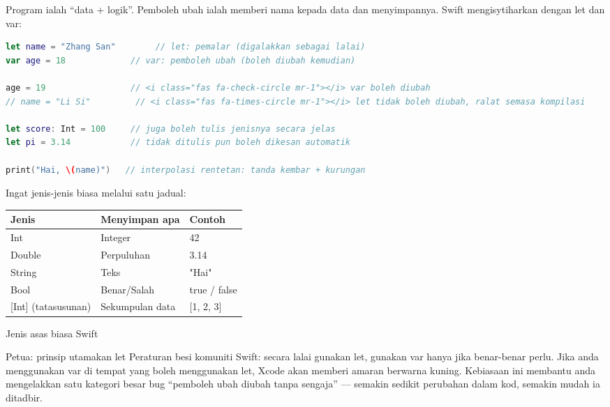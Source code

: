 


Program ialah “data + logik”. Pemboleh ubah ialah memberi nama kepada data dan menyimpannya. Swift mengisytiharkan dengan let dan var:

\begin{lstlisting}[language=Swift]
let name = "Zhang San"        // let: pemalar (digalakkan sebagai lalai)
var age = 18             // var: pemboleh ubah (boleh diubah kemudian)

age = 19                 // <i class="fas fa-check-circle mr-1"></i> var boleh diubah
// name = "Li Si"         // <i class="fas fa-times-circle mr-1"></i> let tidak boleh diubah, ralat semasa kompilasi

let score: Int = 100     // juga boleh tulis jenisnya secara jelas
let pi = 3.14            // tidak ditulis pun boleh dikesan automatik

print("Hai, \(name)")   // interpolasi rentetan: tanda kembar + kurungan
\end{lstlisting}

Ingat jenis-jenis biasa melalui satu jadual:

\begin{center}
\begin{tabularx}{\linewidth}{|X|X|X|}
\hline
\textbf{Jenis} & \textbf{Menyimpan apa} & \textbf{Contoh} \tabularnewline
\hline
Int & Integer & 42 \tabularnewline
Double & Perpuluhan & 3.14 \tabularnewline
String & Teks & "Hai" \tabularnewline
Bool & Benar/Salah & true / false \tabularnewline
{}[Int] (tatasusunan) & Sekumpulan data & {}[1, 2, 3] \tabularnewline
\hline
\end{tabularx}
\end{center}

\begin{center}\small\color{gray}Jenis asas biasa Swift\end{center}

\begin{tcbinfo}{Petua: prinsip utamakan let}
Peraturan besi komuniti Swift: secara lalai gunakan let, gunakan var hanya jika benar-benar perlu. Jika anda menggunakan var di tempat yang boleh menggunakan let, Xcode akan memberi amaran berwarna kuning. Kebiasaan ini membantu anda mengelakkan satu kategori besar bug “pemboleh ubah diubah tanpa sengaja” — semakin sedikit perubahan dalam kod, semakin mudah ia ditadbir.

\end{tcbinfo}


